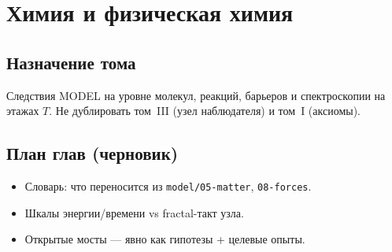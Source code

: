 \part{Химия и физическая химия}

\chapter{Назначение тома}
Следствия MODEL на уровне молекул, реакций, барьеров и спектроскопии
на этажах $T$. Не дублировать том~III (узел наблюдателя) и том~I (аксиомы).

\chapter{План глав (черновик)}
\begin{itemize}
  \item Словарь: что переносится из \texttt{model/05-matter}, \texttt{08-forces}.
  \item Шкалы энергии/времени vs fractal-такт узла.
  \item Открытые мосты --- явно как гипотезы + целевые опыты.
\end{itemize}
